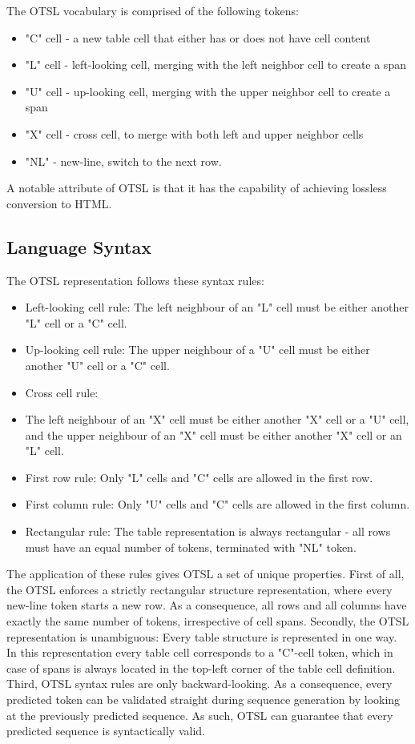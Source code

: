 \documentclass[11pt,a4paper]{article}
\begin{document}
The OTSL vocabulary is comprised of the following tokens:

\begin{itemize}
\item "C" cell - a new table cell that either has or does not have cell content
\item "L" cell - left-looking cell, merging with the left neighbor cell to create a span
\item "U" cell - up-looking cell, merging with the upper neighbor cell to create a span
\item "X" cell - cross cell, to merge with both left and upper neighbor cells
\item "NL" - new-line, switch to the next row.
\end{itemize}

A notable attribute of OTSL is that it has the capability of achieving lossless conversion to HTML.

\subsection{Language Syntax}

The OTSL representation follows these syntax rules:

\begin{itemize}
\item Left-looking cell rule: The left neighbour of an "L" cell must be either another "L" cell or a "C" cell.
\item Up-looking cell rule: The upper neighbour of a "U" cell must be either another "U" cell or a "C" cell.
\item Cross cell rule:
\item The left neighbour of an "X" cell must be either another "X" cell or a "U" cell, and the upper neighbour of an "X" cell must be either another "X" cell or an "L" cell.
\item First row rule: Only "L" cells and "C" cells are allowed in the first row.
\item First column rule: Only "U" cells and "C" cells are allowed in the first column.
\item Rectangular rule: The table representation is always rectangular - all rows must have an equal number of tokens, terminated with "NL" token.
\end{itemize}

The application of these rules gives OTSL a set of unique properties. First of all, the OTSL enforces a strictly rectangular structure representation, where every new-line token starts a new row. As a consequence, all rows and all columns have exactly the same number of tokens, irrespective of cell spans. Secondly, the OTSL representation is unambiguous: Every table structure is represented in one way. In this representation every table cell corresponds to a "C"-cell token, which in case of spans is always located in the top-left corner of the table cell definition. Third, OTSL syntax rules are only backward-looking. As a consequence, every predicted token can be validated straight during sequence generation by looking at the previously predicted sequence. As such, OTSL can guarantee that every predicted sequence is syntactically valid.
\end{document}
